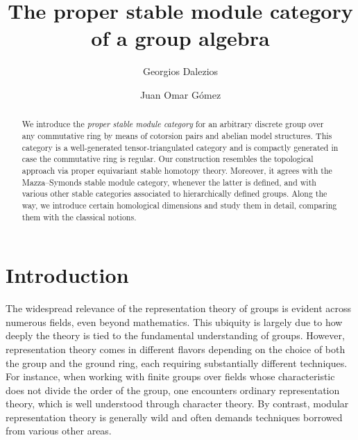 \documentclass{amsart}
\title[The proper stable module category]
{The proper stable module category of a group algebra}
\numberwithin{equation}{section}%
\theoremstyle{remark}
\begin{document}
\author[]{Georgios Dalezios}
\author[]{Juan Omar G\'omez}


\address{Georgios Dalezios, Dipartimento di Informatica - Settore di Matematica, Università degli Studi di Verona, Strada le Grazie 15 - Ca’ Vignal, I-37134 Verona, Italy}

\address{Juan Omar G\'omez, Fakultat f\"ur Mathematik, Universit\"at Bielefeld, D-33501 Bielefeld, Germany}



\begin{abstract}
We introduce the \textit{proper stable module category} for an arbitrary discrete group over any commutative ring by means of cotorsion pairs and abelian model structures. This category is a well-generated tensor-triangulated category and is compactly generated in case the commutative ring is regular. Our construction resembles the topological approach via proper equivariant stable homotopy theory. Moreover, it agrees with the Mazza--Symonds stable module category, whenever the latter is defined, and with various other  stable categories associated to hierarchically defined groups. Along the way, we introduce certain homological dimensions and study them in detail, comparing them with the classical notions.
\end{abstract}

\maketitle

\setcounter{tocdepth}{1}


\tableofcontents


\section{Introduction}

The widespread relevance of the representation theory of groups is evident across numerous fields, even beyond mathematics. This ubiquity is largely due to how deeply the theory is tied to the fundamental understanding of groups. However, representation theory comes in different flavors depending on the choice of both the group and the ground ring, each requiring substantially different techniques. For instance, when working with finite groups over fields whose characteristic does not divide the order of the group, one encounters ordinary representation theory, which is well understood through character theory. By contrast, modular representation theory is generally wild and often demands techniques borrowed from various other areas.
\end{document}
